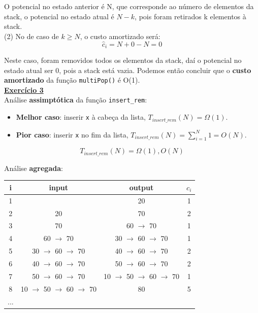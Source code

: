\documentclass[a4paper,11pt]{article}
\begin{document}
	\noindent O potencial no estado anterior é N, que corresponde ao número de elementos da stack, o potencial no estado atual é $ N - k $, pois foram retirados k elementos à stack.\\
	
	\noindent (2) No de caso de $ k \geq N $, o custo amortizado será:
	\[
		\hat{c}_i = N + 0 - N = 0
	\]
	
	\noindent Neste caso, foram removidos todos os elementos da stack, daí o potencial no estado atual ser 0, pois a stack está vazia. Podemos então concluir que o \textbf{custo amortizado} da função \texttt{multiPop()} é O(1).\\
	
	
	\noindent \underline{\textbf{Exercício 3}}\\
	
	\noindent Análise \textbf{assimptótica} da função \texttt{insert\_rem}:
	\begin{itemize}
		\item \textbf{Melhor caso}: inserir \texttt{x} à cabeça da lista, $ T_{insert\_rem}(N) = \Omega(1) $.
		\item \textbf{Pior caso}: inserir \texttt{x} no fim da lista, $ T_{insert\_rem}(N) = \sum_{i=1}^{N} 1 = O(N) $.
	\end{itemize}
	\[
		T_{insert\_rem}(N) = \Omega(1), O(N)
	\]
	
	\noindent Análise \textbf{agregada}:
	
	\begin{center}
	\begin{tabular}{|c|c|c|c|}
		\hline
		i & input & output & $ c_i $ \\
		\hline
		\hline
		1 & & 20 & 1 \\
		2 & 20 & 70 & 2 \\
		3 & 70 & 60 $\rightarrow$ 70 & 1 \\
		4 & 60 $\rightarrow$ 70 & 30 $\rightarrow$ 60 $\rightarrow$ 70 & 1 \\
		5 & 30 $\rightarrow$ 60 $\rightarrow$ 70 & 40 $\rightarrow$ 60 $\rightarrow$ 70 & 2 \\
		6 & 40 $\rightarrow$ 60 $\rightarrow$ 70 & 50 $\rightarrow$ 60 $\rightarrow$ 70 & 2 \\
		7 & 50 $\rightarrow$ 60 $\rightarrow$ 70 & 10 $\rightarrow$ 50 $\rightarrow$ 60 $\rightarrow$ 70 & 1 \\
		8 & 10 $\rightarrow$ 50 $\rightarrow$ 60 $\rightarrow$ 70 & 80 & 5 \\
		... & & & \\
		\hline
	\end{tabular}
	\end{center}
	
\end{document}
